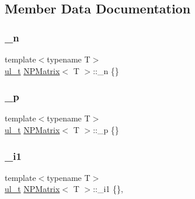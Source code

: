 \subsection{Member Data Documentation}
\mbox{\label{class_n_p_matrix_a6ead143a6f35fc3247c26c2442841ba9}} 
\subsubsection{\texorpdfstring{\_n}{\_n}}
{\footnotesize\ttfamily template$<$typename T$>$ \\
\mbox{\hyperlink{group___n_algebra_ga1b140a2034db3f5dfe18a987745df43a}{ul\+\_\+t}} \mbox{\hyperlink{class_n_p_matrix}{N\+P\+Matrix}}$<$ T $>$\+::\+\_\+n \{\}\hspace{0.3cm}{\ttfamily [protected]}}

\mbox{\label{class_n_p_matrix_aa1571de5d091b0b2e71fd665da3eb7e1}} 
\subsubsection{\texorpdfstring{\_p}{\_p}}
{\footnotesize\ttfamily template$<$typename T$>$ \\
\mbox{\hyperlink{group___n_algebra_ga1b140a2034db3f5dfe18a987745df43a}{ul\+\_\+t}} \mbox{\hyperlink{class_n_p_matrix}{N\+P\+Matrix}}$<$ T $>$\+::\+\_\+p \{\}\hspace{0.3cm}{\ttfamily [protected]}}

\mbox{\label{class_n_p_matrix_a0cae48bb6660c2d00136ce8600d0fc28}} 
\subsubsection{\texorpdfstring{\_i1}{\_i1}}
{\footnotesize\ttfamily template$<$typename T$>$ \\
\mbox{\hyperlink{group___n_algebra_ga1b140a2034db3f5dfe18a987745df43a}{ul\+\_\+t}} \mbox{\hyperlink{class_n_p_matrix}{N\+P\+Matrix}}$<$ T $>$\+::\+\_\+i1 \{\}\hspace{0.3cm}{\ttfamily [mutable]}, {\ttfamily [protected]}}

